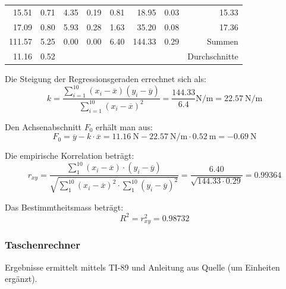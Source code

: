 \begin{tabular}{rrrrrrrr}
              15.51&        0.71&               4.35  &               0.19  &                 0.81                   &        18.95           &         0.03           &  15.33 \\
              17.09&        0.80&               5.93  &               0.28  &                 1.63                   &        35.20           &         0.08           &  17.36 \\
    \midrule
             111.57&        5.25&               0.00  &               0.00  &                 6.40                   &       144.33           &         0.29           & Summen \\
    \midrule
              11.16&        0.52&&&&&& Durchschnitte \\
    \bottomrule
\end{tabular}

Die Steigung der Regressionsgeraden errechnet sich als:
\begin{equation}
    k = \frac{\sum_{i=1}^{10}(x_i-\overline{x})(y_i-\overline{y})}{\sum_{i=1}^{10}(x_i-\overline{x})^2} = \frac{144.33}{6.4} \si{\newton\per\meter} = \SI{22.57}{\newton\per\meter}
\end{equation}

Den Achsenabschnitt $F_0$ erh\"alt man aus:
\begin{equation}
    F_0 = \overline{y} - k \cdot \overline{x} = \SI{11.16}{\newton} - \SI{22.57}{\newton\per\meter} \cdot \SI{0.52}{\meter} = \SI{-0.69}{\newton}
\end{equation}

Die empirische Korrelation betr\"agt:
\begin{equation}
    r_{xy} = \frac{\sum_{1}^{10}(x_i - \overline{x}) \cdot (y_i - \overline{y})}{\sqrt{\sum_{1}^{10}(x_i-\overline{x})^2 \cdot \sum_{1}^{10}(y_i-\overline{y})^2}}
           = \frac{6.40}{\sqrt{144.33 \cdot 0.29}} = 0.99364
\end{equation}

Das Bestimmtheitsmass betr\"agt:
\begin{equation}
    R^{2} = r_{xy}^2 = 0.98732
\end{equation}

\subsubsection{Taschenrechner}

Ergebnisse    ermittelt   mittels    TI-89    und    Anleitung   aus    Quelle
\cite{ref:ti89:regression} (um Einheiten erg\"anzt).

